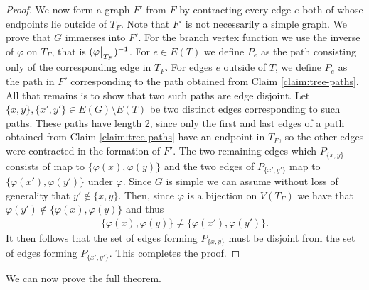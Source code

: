 \documentclass[11pt]{article}
\begin{document}
\begin{proof}
    We now form a graph $F'$ from $F$ by contracting every edge $e$ both of whose endpoints lie outside of $T_F$. Note that $F'$ is not necessarily a simple graph.
    We prove that $G$ immerses into $F'$. For the branch vertex function we use the inverse of $\varphi$ on $T_F$, that is $(\restr{\varphi}{T_F})^{-1}$. For $e \in E(T)$ we define $P_e$ as the path consisting only of the corresponding edge in $T_F$. For edges $e$ outside of $T$, we define $P_e$ as the path in $F'$ corresponding to the path obtained from Claim \ref{claim:tree-paths}. 
    All that remains is to show that two such paths are edge disjoint. Let $\{x,y\}, \{x',y'\} \in E(G)\setminus E(T)$ be two distinct edges corresponding to such paths. These paths have length 2, since only the first and last edges of a path obtained from Claim \ref{claim:tree-paths} have an endpoint in $T_F$, so the other edges were contracted in the formation of $F'$. The two remaining edges which $P_{\{x,y\}}$ consists of map to $\{\varphi(x), \varphi(y)\}$ and the two edges of $P_{\{x',y'\}}$ map to $\{\varphi(x'), \varphi(y')\}$ under $\varphi$. 
    Since $G$ is simple we can assume without loss of generality that $y' \notin \{x,y\}$. 
    Then, since $\varphi$ is a bijection on $V(T_F)$ we have that $\varphi(y') \notin \{\varphi(x), \varphi(y)\}$ and thus
    \begin{align*}
        \{\varphi(x), \varphi(y)\} \neq \{\varphi(x'), \varphi(y')\}.
    \end{align*}
    It then follows that the set of edges forming $P_{\{x,y\}}$ must be disjoint from the set of edges forming $P_{\{x',y'\}}$. This completes the proof.
\end{proof}

We can now prove the full theorem.
\end{document}

